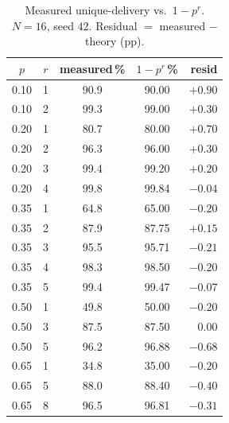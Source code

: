 \documentclass[10pt,twocolumn]{article}
\begin{document}
\begin{table}[t]\centering\small
\caption{Measured unique-delivery vs.\ $1-p^{r}$. $N{=}16$, seed $42$.
Residual $=$ measured $-$ theory (pp).}
\label{tab:grid}
\begin{tabular}{ccccr}
\toprule
$p$ & $r$ & measured\,\% & $1-p^r$\,\% & resid \\
\midrule
0.10 & 1 & 90.9 & 90.00 & $+0.90$\\
0.10 & 2 & 99.3 & 99.00 & $+0.30$\\
0.20 & 1 & 80.7 & 80.00 & $+0.70$\\
0.20 & 2 & 96.3 & 96.00 & $+0.30$\\
0.20 & 3 & 99.4 & 99.20 & $+0.20$\\
0.20 & 4 & 99.8 & 99.84 & $-0.04$\\
0.35 & 1 & 64.8 & 65.00 & $-0.20$\\
0.35 & 2 & 87.9 & 87.75 & $+0.15$\\
0.35 & 3 & 95.5 & 95.71 & $-0.21$\\
0.35 & 4 & 98.3 & 98.50 & $-0.20$\\
0.35 & 5 & 99.4 & 99.47 & $-0.07$\\
0.50 & 1 & 49.8 & 50.00 & $-0.20$\\
0.50 & 3 & 87.5 & 87.50 & $\;\;0.00$\\
0.50 & 5 & 96.2 & 96.88 & $-0.68$\\
0.65 & 1 & 34.8 & 35.00 & $-0.20$\\
0.65 & 5 & 88.0 & 88.40 & $-0.40$\\
0.65 & 8 & 96.5 & 96.81 & $-0.31$\\
\bottomrule
\end{tabular}
\end{table}
\end{document}
